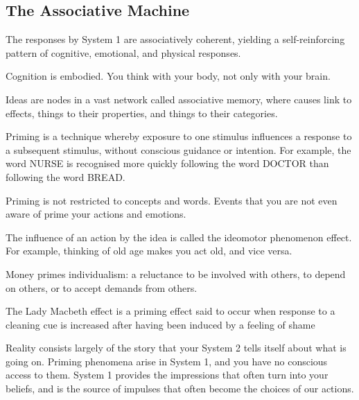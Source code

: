 \subsection*{The Associative Machine}
\bit
\item The responses by System 1 are associatively coherent, yielding a self-reinforcing pattern of cognitive,
emotional, and physical responses.
\item Cognition is embodied. You think with your body, not only with your brain.
\item Ideas are nodes in a vast network called associative memory, where causes link to effects, things to their
properties, and things to their categories.
\item Priming is a technique whereby exposure to one stimulus influences a response to a subsequent stimulus, without
conscious guidance or intention. For example, the word NURSE is recognised more quickly following the word DOCTOR
than following the word BREAD.
\item Priming is not restricted to concepts and words. Events that you are not even aware of prime your actions and
emotions.
\item The influence of an action by the idea is called the ideomotor phenomenon effect. For example, thinking of old
age makes you act old, and vice versa.
\item Money primes individualism: a reluctance to be involved with others, to depend on others, or to accept demands
from others.
\item The Lady Macbeth effect is a priming effect said to occur when response to a cleaning cue is increased after
having been induced by a feeling of shame
\item Reality consists largely of the story that your System 2 tells itself about what is going on. Priming phenomena
arise in System 1, and you have no conscious access to them. System 1 provides the impressions that often turn into
your beliefs, and is the source of impulses that often become the choices of our actions.
\eit

